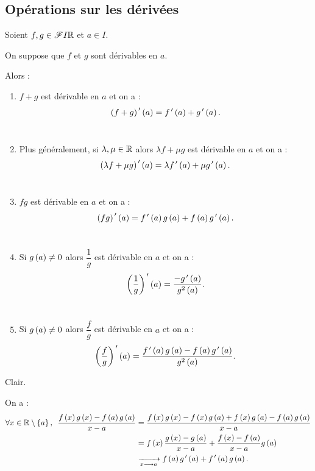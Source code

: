 \subsection{Opérations sur les dérivées}

\begin{prop}
Soient \(f,g\in\mathscr{F}{I}{\mathbb{R}}\) et \(a\in I\).

On suppose que \(f\) et \(g\) sont dérivables en \(a\).

Alors :

\begin{enumerate}
\item \(f+g\) est dérivable en \(a\) et on a : \[\left(f+g\right)^{\,\prime}\left(a\right)=f^{\,\prime}\left(a\right)+g^{\,\prime}\left(a\right).\] \\

\item Plus généralement, si \(\lambda,\mu\in\mathbb{R}\) alors \(\lambda f+\mu g\) est dérivable en \(a\) et on a : \[\left(\lambda f+\mu g\right)^{\,\prime}\left(a\right)=\lambda f^{\,\prime}\left(a\right)+\mu g^{\,\prime}\left(a\right).\] \\

\item \(fg\) est dérivable en \(a\) et on a : \[\left(fg\right)^{\,\prime}\left(a\right)=f^{\,\prime}\left(a\right)g\left(a\right)+f\left(a\right)g^{\,\prime}\left(a\right).\] \\

\item Si \(g\left(a\right)\not=0\) alors \(\dfrac{1}{g}\) est dérivable en \(a\) et on a : \[\left(\dfrac{1}{g}\right)^{\,\prime}\left(a\right)=\dfrac{-g^{\,\prime}\left(a\right)}{g^2\left(a\right)}.\] \\

\item Si \(g\left(a\right)\not=0\) alors \(\dfrac{f}{g}\) est dérivable en \(a\) et on a : \[\left(\dfrac{f}{g}\right)^{\,\prime}\left(a\right)=\dfrac{f^{\,\prime}\left(a\right)g\left(a\right)-f\left(a\right)g^{\,\prime}\left(a\right)}{g^2\left(a\right)}.\]
\end{enumerate}
\end{prop}

\begin{dem}[1 et 2]
Clair.
\end{dem}

\begin{dem}[3]
On a : \[\begin{aligned}
\quantifs{\forall x\in\R\excluant\accol{a}}\dfrac{f\paren{x}g\paren{x}-f\paren{a}g\paren{a}}{x-a}&=\dfrac{f\paren{x}g\paren{x}-f\paren{x}g\paren{a}+f\paren{x}g\paren{a}-f\paren{a}g\paren{a}}{x-a} \\
&=f\paren{x}\dfrac{g\paren{x}-g\paren{a}}{x-a}+\dfrac{f\paren{x}-f\paren{a}}{x-a}g\paren{a} \\
&\tendqd{x\to a}f\paren{a}g\prim\paren{a}+f\prim\paren{a}g\paren{a}.
\end{aligned}\]
\end{dem}

